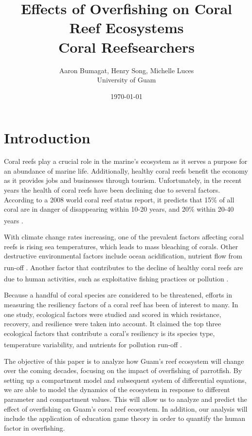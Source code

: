 \documentclass[12pt]{article}
\title{Effects of Overfishing on Coral Reef Ecosystems\\Coral Reefsearchers}
\author{Aaron Bumagat, Henry Song, Michelle Luces\\University of Guam}
\date{\today}
\begin{document}
\maketitle
\section{Introduction}
Coral reefs play a crucial role in the marine's ecosystem as it serves a purpose for an abundance of marine life. Additionally, healthy coral reefs benefit the economy as it provides jobs and businesses through tourism. Unfortunately, in the recent years the health of coral reefs have been declining due to several factors. According to a 2008 world coral reef status report, it predicts that 15\% of all coral are in danger of disappearing within 10-20 years, and 20\% within 20-40 years \textsuperscript{\cite{05_quintero_machuca_cotto_bradley_ríos-soto_2016}}. 

With climate change rates increasing, one of the prevalent factors affecting coral reefs is rising sea temperatures, which leads to mass bleaching of corals. Other destructive environmental factors include ocean acidification, nutrient flow from run-off \textsuperscript{\cite{05_quintero_machuca_cotto_bradley_ríos-soto_2016}}. Another factor that contributes to the decline of healthy coral reefs are due to human activities, such as exploitative fishing practices or pollution \textsuperscript{\cite{04_mathanalysis}}. 

Because a handful of coral species are considered to be threatened, efforts in measuring the resiliency factors of a coral reef has been of interest to many. In one study, ecological factors were studied and scored in which resistance, recovery, and resilience were taken into account. It claimed the top three ecological factors that contribute a coral's resiliency is its species type, temperature variability, and nutrients for pollution run-off \textsuperscript{\cite{02_Riegl_Purkis_Model}}. 

The objective of this paper is to analyze how Guam's reef ecosystem will change over the coming decades, focusing on the impact of overfishing of parrotfish. By setting up a compartment model and subsequent system of differential equations, we are able to model the dynamics of the ecosystem in response to different parameter and compartment values. This will allow us to analyze and predict the effect of overfishing on Guam's coral reef ecosystem. In addition, our analysis will include the application of education game theory in order to quantify the human factor in overfishing.
\end{document}
